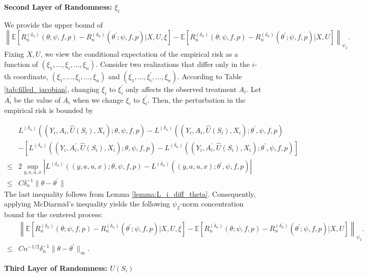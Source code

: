 \documentclass[12pt]{article}
\newcommand{\E}{\mathbb{E}}
\begin{document}
\noindent\textbf{Second Layer of Randomness: $\xi_i$}

\noindent We provide the upper bound of 
$$\left\|\E\left[R_n^{(\delta_n)}(\theta;\psi,f,p)-R_n^{({\delta_n})}(\theta^\prime;\psi,f,p)|X,U,\xi\right]-\E\left[R_n^{(\delta_n)}(\theta;\psi,f,p)-R_n^{({\delta_n})}(\theta^\prime;\psi,f,p)|X,U\right]\right\|_{\psi_2}.$$
Fixing $X,U$, we view the conditional expectation of the empirical risk as a function of $(\xi_1, \ldots,\xi_i,\ldots, \xi_n)$. Consider two realizations that differ only in the $i$-th coordinate, $(\xi_1, \ldots,\xi_i,\ldots, \xi_n)$ and $(\xi_1, \ldots,\xi_i^\prime,\ldots, \xi_n)$. According to Table \ref{tab:filled_jacobian}, changing $\xi_i$ to $\xi_i^\prime$ only affects the observed treatment $A_i$. Let $A_i^\prime$ be the value of $A_i$ when we change $\xi_i$ to $\xi_i^\prime$. Then, the perturbation in the empirical risk is bounded by

\begin{align*}
&L^{(\delta_n)}((Y_i,A_i,\widehat U(S_i),X_i);\theta,\psi,f,p) - L^{(\delta_n)}((Y_i,A_i,\widehat U(S_i),X_i);\theta^\prime,\psi,f,p)\\
        & -\left[L^{(\delta_n)}((Y_i,A_i^\prime,\widehat U(S_i),X_i);\theta,\psi,f,p) - L^{(\delta_n)}((Y_i,A_i^\prime,\widehat U(S_i),X_i);\theta^\prime,\psi,f,p)\right]\\
        \leq  & 2\sup_{y,a,u,x}\left|L^{(\delta_n)}((y,a,u,x);\theta,\psi,f,p) - L^{(\delta_n)}((y,a,u,x);\theta^\prime,\psi,f,p)\right|\\
        \leq & C\delta_n^{-1}\|\theta-\theta^\prime\|
\end{align*}
The last inequality follows from Lemma \ref{lemma:L_i_diff_theta}. Consequently, applying McDiarmid's inequality yields the following $\psi_2$-norm concentration bound for the centered process:
\begin{align*}
    &\left\|\E\left[R_n^{(\delta_n)}(\theta;\psi,f,p)-R_n^{({\delta_n})}(\theta^\prime;\psi,f,p)|X,U,\xi\right]-\E\left[R_n^{(\delta_n)}(\theta;\psi,f,p)-R_n^{({\delta_n})}(\theta^\prime;\psi,f,p)|X,U\right]\right\|_{\psi_2}.\\
    \leq & C n^{-1/2}\delta_n^{-1}\|\theta - \theta^\prime\|_{\infty}.
\end{align*}

\noindent\textbf{Third Layer of Randomness: $U(S_i)$}
\end{document}
